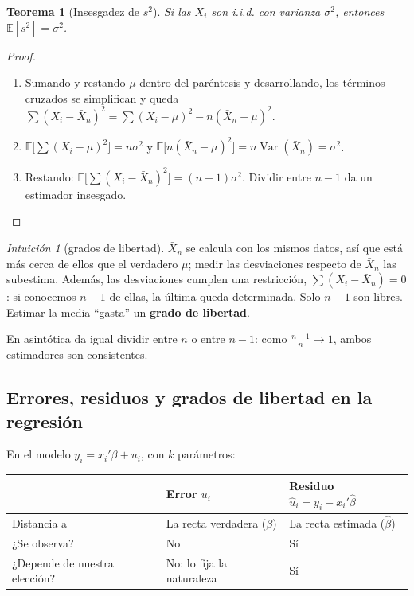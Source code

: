 \documentclass[11pt,a4paper]{article}
\theoremstyle{plain}
\newtheorem{teorema}{Teorema}[section]
\theoremstyle{definition}
\theoremstyle{remark}
\newtheorem*{intuicion}{Intuición}
\newcommand{\E}{\mathbb{E}}
\DeclareMathOperator{\Var}{Var}
\begin{document}
\begin{teorema}[Insesgadez de $s^2$]\label{teo:s2}
Si las $X_i$ son i.i.d. con varianza $\sigma^2$, entonces $\E[s^2]=\sigma^2$.
\end{teorema}
\begin{proof}
\begin{enumerate}
  \item Sumando y restando $\mu$ dentro del paréntesis y desarrollando, los términos cruzados se
        simplifican y queda
        $\sum(X_i-\bar X_n)^2=\sum(X_i-\mu)^2-n(\bar X_n-\mu)^2$.
  \item $\E\big[\sum(X_i-\mu)^2\big]=n\sigma^2$ y
        $\E\big[n(\bar X_n-\mu)^2\big]=n\Var(\bar X_n)=\sigma^2$.
  \item Restando: $\E\big[\sum(X_i-\bar X_n)^2\big]=(n-1)\sigma^2$. Dividir entre $n-1$ da un
        estimador insesgado.
\end{enumerate}
\end{proof}

\begin{intuicion}[grados de libertad]
$\bar X_n$ se calcula con los mismos datos, así que está más cerca de ellos que el verdadero
$\mu$; medir las desviaciones respecto de $\bar X_n$ las subestima. Además, las desviaciones
cumplen una restricción, $\sum(X_i-\bar X_n)=0$: si conocemos $n-1$ de ellas, la última queda
determinada. Solo $n-1$ son libres. Estimar la media ``gasta'' un \textbf{grado de libertad}.

En asintótica da igual dividir entre $n$ o entre $n-1$: como $\frac{n-1}{n}\to1$, ambos
estimadores son consistentes.
\end{intuicion}

\subsection{Errores, residuos y grados de libertad en la regresión}\label{sec:gl}

En el modelo $y_i=x_i'\beta+u_i$, con $k$ parámetros:

\begin{center}
\begin{tabular}{@{}p{3.2cm}p{5.2cm}p{5.2cm}@{}}
\toprule
 & Error $u_i$ & Residuo $\hat u_i=y_i-x_i'\hat\beta$ \\
\midrule
Distancia a & La recta verdadera ($\beta$) & La recta estimada ($\hat\beta$) \\
¿Se observa? & No & Sí \\
¿Depende de nuestra elección? & No: lo fija la naturaleza & Sí \\
\bottomrule
\end{tabular}
\end{center}
\end{document}
